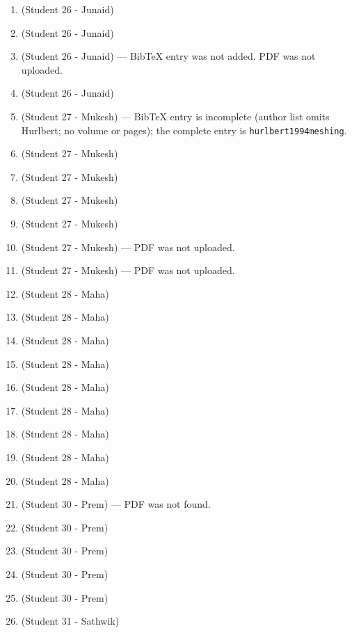 \documentclass{article}
\begin{document}
\begin{enumerate}[label=\#\arabic*,noitemsep,nolistsep]
\item \cite{dai2012making} (Student 26 - Junaid)
\item \cite{lei2013design} (Student 26 - Junaid)
\item \cite{gabric2025constructing} (Student 26 - Junaid) --- BibTeX entry was not added. PDF was not uploaded.
\item \cite{mao2025homomorphism} (Student 26 - Junaid)
\item \cite{isaak1994meshing} (Student 27 - Mukesh) --- BibTeX entry is incomplete (author list omits Hurlbert; no volume or pages); the complete entry is \texttt{hurlbert1994meshing}.
\item \cite{chen2024robot} (Student 27 - Mukesh)
\item \cite{hurlbert1997higher} (Student 27 - Mukesh)
\item \cite{roig2024arithmetic} (Student 27 - Mukesh)
\item \cite{stelldinger2024puzzleboard} (Student 27 - Mukesh)
\item \cite{hsieh2002bruijn} (Student 27 - Mukesh) --- PDF was not uploaded.
\item \cite{roig2022bruijn} (Student 27 - Mukesh) --- PDF was not uploaded.
\item \cite{hurlbert1993bruijn} (Student 28 - Maha)
\item \cite{cock1988toroidal} (Student 28 - Maha)
\item \cite{kim2002existence} (Student 28 - Maha)
\item \cite{kanetkar1980construction} (Student 28 - Maha)
\item \cite{horvath2008growing} (Student 28 - Maha)
\item \cite{hurlbert1995new} (Student 28 - Maha)
\item \cite{kang2026bruijn} (Student 28 - Maha)
\item \cite{calvin1996matrix} (Student 28 - Maha)
\item \cite{stelldinger2025bruijn} (Student 28 - Maha)
\item \cite{etzion1990pseudo} (Student 30 - Prem) --- PDF was not found.
\item \cite{ivanyi2013prism} (Student 30 - Prem)
\item \cite{xu2007robust} (Student 30 - Prem)
\item \cite{blakley2000two} (Student 30 - Prem)
\item \cite{huang2014fast} (Student 30 - Prem)
\item \cite{kreitzer2024alternating} (Student 31 - Sathwik)

\end{enumerate}
\end{document}
